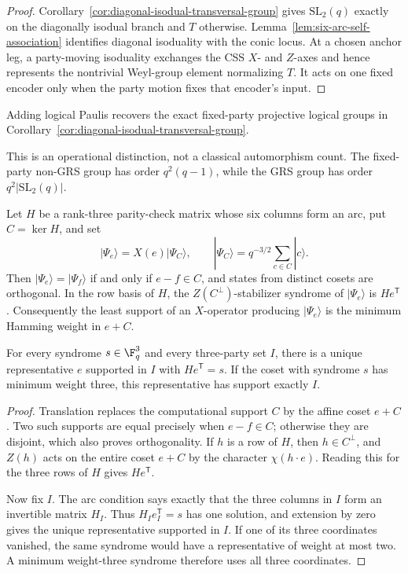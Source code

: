 \begin{proof}
Corollary~\ref{cor:diagonal-isodual-transversal-group} gives
\(\mathrm{SL}_2(q)\) exactly on the diagonally isodual branch and \(T\)
otherwise.  Lemma~\ref{lem:six-arc-self-association} identifies diagonal
isoduality with the conic locus.  At a chosen anchor leg, a party-moving
isoduality exchanges the CSS \(X\)- and \(Z\)-axes and hence represents
the nontrivial Weyl-group element normalizing \(T\).  It acts on one fixed
encoder only when the party motion fixes that encoder's input.
\end{proof}

Adding logical Paulis recovers the exact fixed-party projective logical
groups in Corollary~\ref{cor:diagonal-isodual-transversal-group}.

This is an operational distinction, not a classical automorphism count.
The fixed-party non-GRS group has order \(q^2(q-1)\), while the GRS
group has order \(q^2\lvert\mathrm{SL}_2(q)\rvert\).

\begin{lemma}
\label{lem:coset-syndrome-charts}
Let \(H\) be a rank-three parity-check matrix whose six columns form an
arc, put \(C=\ker H\), and set
\[
 |\Psi_e\rangle=X(e)|\Psi_C\rangle,
 \qquad
 |\Psi_C\rangle=q^{-3/2}\sum_{c\in C}|c\rangle .
\]
Then \(|\Psi_e\rangle=|\Psi_f\rangle\) if and only if \(e-f\in C\),
and states from distinct cosets are orthogonal.  In the row basis of
\(H\), the \(Z(C^\perp)\)-stabilizer syndrome of
\(|\Psi_e\rangle\) is \(He^{\mathsf T}\).
Consequently the least support of an \(X\)-operator producing
\(|\Psi_e\rangle\) is the minimum Hamming weight in \(e+C\).

For every syndrome \(s\in\F_q^3\) and every three-party set \(I\),
there is a unique representative \(e\) supported in \(I\) with
\(He^{\mathsf T}=s\).  If the coset with syndrome \(s\) has minimum
weight three, this representative has support exactly \(I\).
\end{lemma}

\begin{proof}
Translation replaces the computational support \(C\) by the affine coset
\(e+C\).  Two such supports are equal precisely when \(e-f\in C\);
otherwise they are disjoint, which also proves orthogonality.  If \(h\) is
a row of \(H\), then \(h\in C^\perp\), and \(Z(h)\) acts on the entire
coset \(e+C\) by the character \(\chi(h\mathbin\cdot e)\).  Reading this
for the three rows of \(H\) gives \(He^{\mathsf T}\).

Now fix \(I\).  The arc condition says exactly that the three columns in
\(I\) form an invertible matrix \(H_I\).  Thus
\(H_Ie_I^{\mathsf T}=s\) has one solution, and extension by zero gives
the unique representative supported in \(I\).  If one of its three
coordinates vanished, the same syndrome would have a representative of
weight at most two.  A minimum weight-three syndrome therefore uses all
three coordinates.
\end{proof}

